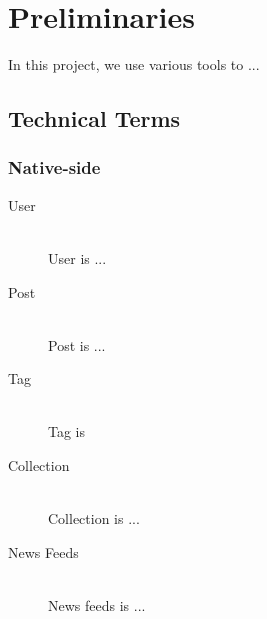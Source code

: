 
%
%

\chapter{Preliminaries}
In this project, we use various tools to ...
\section{Technical Terms}
\subsection{Native-side}
\begin{description}
	\item[User] \hfill \\
	User is ...
	\item[Post] \hfill \\
	Post is ...
	\item[Tag] \hfill \\
	Tag is
	\item[Collection] \hfill \\
	Collection is ...
	\item[News Feeds] \hfill \\
	News feeds is ...
\end{description}
